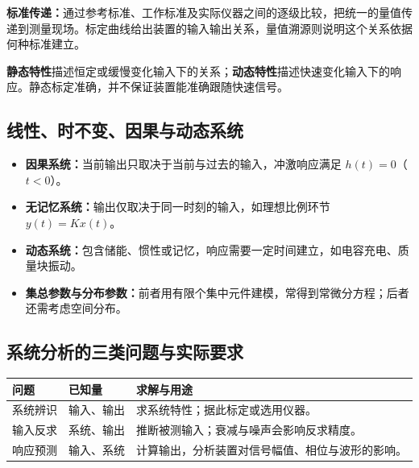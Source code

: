 
\textbf{标准传递：}通过参考标准、工作标准及实际仪器之间的逐级比较，把统一的量值传递到测量现场。标定曲线给出装置的输入输出关系，量值溯源则说明这个关系依据何种标准建立。

\textbf{静态特性}描述恒定或缓慢变化输入下的关系；\textbf{动态特性}描述快速变化输入下的响应。静态标定准确，并不保证装置能准确跟随快速信号。

\subsection{线性、时不变、因果与动态系统}


\begin{itemize}
\item \textbf{因果系统：}当前输出只取决于当前与过去的输入，冲激响应满足 $h(t)=0$（$t<0$）。
\item \textbf{无记忆系统：}输出仅取决于同一时刻的输入，如理想比例环节 $y(t)=Kx(t)$。
\item \textbf{动态系统：}包含储能、惯性或记忆，响应需要一定时间建立，如电容充电、质量块振动。
\item \textbf{集总参数与分布参数：}前者用有限个集中元件建模，常得到常微分方程；后者还需考虑空间分布。
\end{itemize}



\subsection{系统分析的三类问题与实际要求}

\begin{table}[H]
\centering
\begin{tabularx}{\linewidth}{@{}l l X@{}}
\toprule
问题 & 已知量 & 求解与用途 \\
\midrule
系统辨识 & 输入、输出 & 求系统特性；据此标定或选用仪器。 \\
输入反求 & 系统、输出 & 推断被测输入；衰减与噪声会影响反求精度。 \\
响应预测 & 输入、系统 & 计算输出，分析装置对信号幅值、相位与波形的影响。 \\
\bottomrule
\end{tabularx}
\end{table}

